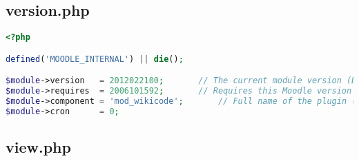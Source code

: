 \subsection{version.php}
\begin{lstlisting}[language=PHP]
<?php

defined('MOODLE_INTERNAL') || die();

$module->version   = 2012022100;       // The current module version (Date: YYYYMMDDXX)
$module->requires  = 2006101592;       // Requires this Moodle version
$module->component = 'mod_wikicode';       // Full name of the plugin (used for diagnostics)
$module->cron      = 0;
\end{lstlisting}

\subsection{view.php}
